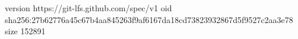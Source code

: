 version https://git-lfs.github.com/spec/v1
oid sha256:27b62776a45c67b4aa845263f9af6167da18cd73823932867d5f9527c2aa3e78
size 152891
